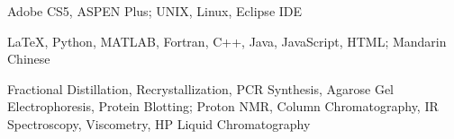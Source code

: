
{
	Adobe CS5,
	ASPEN Plus;
	UNIX,
	Linux,
	Eclipse IDE
}

{
	\LaTeX,
	Python,
	MATLAB,
	Fortran,
	C++,
	Java,
	JavaScript,
	HTML;
	Mandarin Chinese
}

{ 
	Fractional Distillation,
	Recrystallization,
	PCR Synthesis,
	Agarose Gel Electrophoresis,
	Protein Blotting;
	Proton NMR,
	Column Chromatography,
	IR Spectroscopy,
	Viscometry,
	HP Liquid Chromatography
}